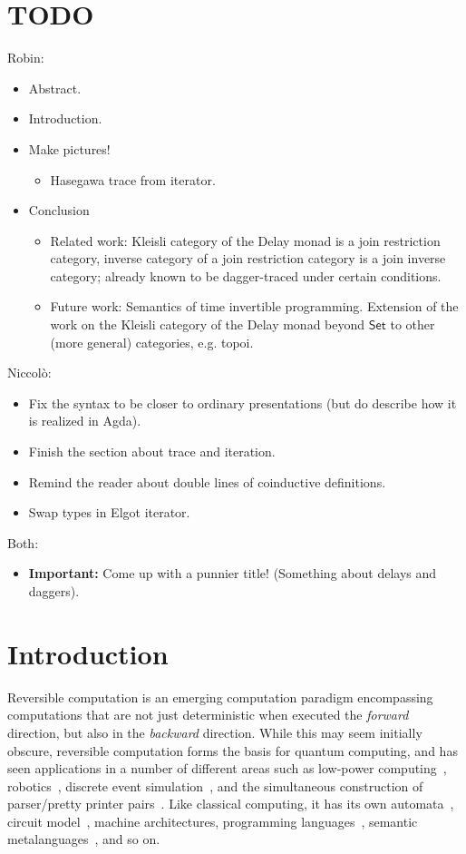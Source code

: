 \documentclass[runningheads,a4paper]{llncs}
\newcommand{\Set}{\mathsf{Set}}
\begin{document}
\section{TODO} %
\label{sec:todo}
Robin:
\begin{itemize}
  \item Abstract.
  \item Introduction.
  \item Make pictures! 
  \begin{itemize}
    \item Hasegawa trace from iterator.
  \end{itemize}
  \item Conclusion
  \begin{itemize}
    \item Related work: Kleisli category of the Delay monad is a join
    restriction category, inverse category of a join restriction category is a
    join inverse category; already known to be dagger-traced under certain
    conditions.
    \item Future work: Semantics of time invertible programming. Extension of
    the work on the Kleisli category of the Delay monad beyond $\Set$ to other
    (more general) categories, e.g. topoi.
  \end{itemize}
\end{itemize}
Niccolò: 
\begin{itemize}
  \item Fix the syntax to be closer to ordinary presentations (but do describe 
  how it is realized in Agda).
  \item Finish the section about trace and iteration.
  \item Remind the reader about double lines of coinductive definitions.
  \item Swap types in Elgot iterator.
\end{itemize}
Both:
\begin{itemize}
  \item \textbf{Important:} Come up with a punnier title! (Something about 
  delays and daggers).
\end{itemize}

\section{Introduction}\label{sec:intro}
Reversible computation is an emerging computation paradigm encompassing
computations that are not just deterministic when executed the \emph{forward}
direction, but also in the \emph{backward} direction. While this may seem
initially obscure, reversible computation forms the basis for quantum
computing, and has seen applications in a number of different areas such as
low-power computing~\cite{Landauer61}, robotics~\cite{SchultzLE18}, discrete
event simulation~\cite{Schordan15}, and the simultaneous construction of
parser/pretty printer pairs~\cite{RendelO10}. Like classical computing, it has
its own automata~\cite{Bennett73}, circuit model~\cite{DeVos10}, machine
architectures, programming
languages~\cite{JamesS12,JamesS14,YokoyamaG07,Schultz18,JacobsenKT18}, semantic
metalanguages~\cite{Giles,KaarsgaardAG17,KaarsgaardG18}, and so on.
\end{document}

